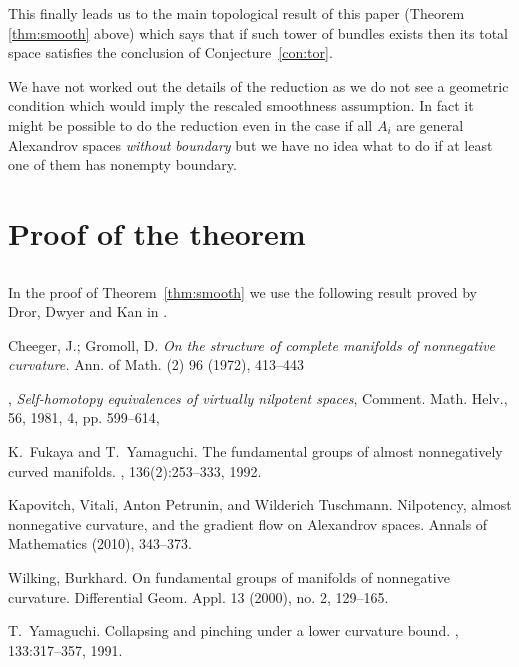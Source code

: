 \documentclass{amsart}
\begin{document}
This finally leads us to the main topological result of this paper (Theorem \ref{thm:smooth} above) which says that if such tower of bundles exists then its total space satisfies the conclusion of Conjecture~\ref{con:tor}.

We have not worked out the details of the reduction as we do not see a geometric condition which would imply the rescaled smoothness assumption.
In fact it might  be possible to do the reduction even in the case if all $A_i$ are general  Alexandrov spaces  \emph{without  boundary} but we have no idea what to do if at least one of them has nonempty boundary.


\section{Proof of the theorem}

\subsection{}
In the proof of Theorem~\ref{thm:smooth} we use the following result proved by Dror,  Dwyer and Kan in \cite{DDK}.



\small

%


\begin{thebibliography}{HMR75}

Cheeger, J.; Gromoll, D.
 \textit{On the structure of complete manifolds of nonnegative curvature.}
Ann. of Math. (2) 96 (1972), 413--443

,
 \textit{Self-homotopy equivalences of virtually nilpotent spaces},
{Comment. Math. Helv.},
{56},
{1981},
{4},
pp. {599--614},

K.~Fukaya and T.~Yamaguchi.
\newblock The fundamental groups of almost nonnegatively curved manifolds.
, 136(2):253--333, 1992.


 Kapovitch, Vitali, Anton Petrunin, and Wilderich Tuschmann. 
\newblock Nilpotency, almost nonnegative curvature, and the gradient flow on Alexandrov spaces. 
\newblock Annals of Mathematics (2010), 343--373.

Wilking, Burkhard. \newblock On fundamental groups of manifolds of nonnegative curvature. \newblock  Differential Geom. Appl.  13  (2000),  no. 2, 129--165.

T.~Yamaguchi.
\newblock Collapsing and pinching under a lower curvature bound.
, 133:317--357, 1991.
\end{thebibliography}
\end{document}
